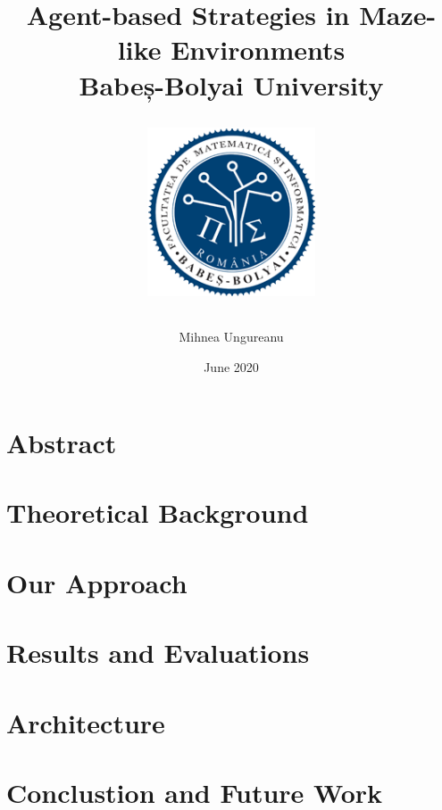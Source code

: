 \documentclass[12pt]{report}
\title{
    {Agent-based Strategies in Maze-like Environments}\\
    {\large Babeș-Bolyai University}\\
    {
        \begin{figure}[h]
            \includegraphics[width=5cm]{logo_cs.png}
            \centering
        \end{figure}
    }
}
\author{Mihnea Ungureanu}
\date{June 2020}
\begin{document}
\maketitle

\chapter*{Abstract}

\tableofcontents

% 

 \chapter{Theoretical Background}
 

 \chapter{Our Approach}
 

 \chapter{Results and Evaluations}
 

 \chapter{Architecture}
 

 \chapter{Conclustion and Future Work}
 
\end{document}
